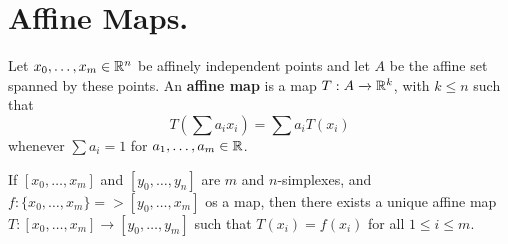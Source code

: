 
\section{Affine Maps.}

\begin{definition}
    Let $x_0, \dots, x_m \in \mathbb{R}^n$ be affinely independent points and let $A$ be
    the affine set spanned by these points. An \textbf{affine map} is a map $T:A
    \xrightarrow{} \mathbb{R}^k$, with $k \leq n$ such that
    \begin{equation*}
        T(\sum{a_i}x_i)=\sum{a_iT(x_i)}
    \end{equation*}
    whenever $\sum{a_i}=1$ for $a_1, \dots, a_m \in \mathbb{R}$.
\end{definition}

\begin{theorem}\label{3.2.1}
    If $[x_0, \dots, x_m]$ and $[y_0, \dots, y_n]$ are $m$ and  $n$-simplexes,
    and  $f:\{x_0, \dots, x_m\} => [y_0, \dots, x_m]$ os a map, then there
    exists a unique affine map $T:[x_0, \dots, x_m] \xrightarrow{} [y_0, \dots,
    y_m]$ such that $T(x_i)=f(x_i)$ for all $1 \leq i \leq m$.
\end{theorem}

